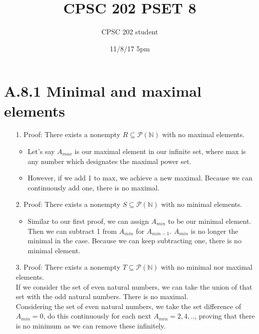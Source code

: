 \documentclass[12pt]{article}
\title{CPSC 202 PSET 8}
\author{CPSC 202 student}
\date{11/8/17 5pm}
\begin{document}
\maketitle

\section*{A.8.1 Minimal and maximal elements}
\begin{enumerate}
  \item[1.] Proof: There exists a nonempty $R\subseteq \mathcal{P}(\mathbb{N})$ with no maximal elements.  
    \begin{itemize}
      \item Let's say $A_{max}$ is our maximal element in our infinite set, where max is any number which designates the maximal power set. 
      \item However, if we add 1 to max, we achieve a new maximal. Because we can continuously add one, there is no maximal.
    \end{itemize}
  \item[2.] Proof: There exists a nonempty $S\subseteq\mathcal{P}(\mathbb{N})$ with no minimal elements.
    \begin{itemize}
      \item Similar to our first proof, we can assign $A_{min}$ to be our minimal element. Then we can subtract 1 from $A_{min}$ for $A_{min-1}$. $A_{min}$ is no longer the minimal in the case. Because we can keep subtracting one, there is no minimal element.
    \end{itemize}
  \item[3.] Proof: There exists a nonempty $T\subseteq\mathcal{P}(\mathbb{N})$ with no minimal nor maximal elements.
    \\ If we consider the set of even natural numbers, we can take the union of that set with the odd natural numbers. There is no maximal.
    \\ Considering the set of even natural numbers, we take the set difference of $A_{min} = 0$, do this continuously for each next $A_{min}=2,4,..$, proving that there is no minimum as we can remove these infinitely.
\end{enumerate}
\end{document}
